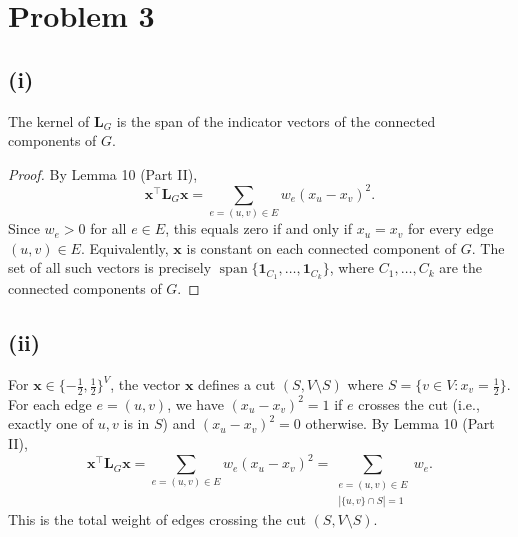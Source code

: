 \section*{Problem 3}

\subsection*{(i)}
The kernel of $\mathbf{L}_G$ is the span of the indicator vectors of the connected components of $G$.

\begin{proof}
By Lemma 10 (Part II),
\[
\mathbf{x}^\top \mathbf{L}_G \mathbf{x} = \sum_{e = (u,v) \in E} w_e (x_u - x_v)^2.
\]
Since $w_e > 0$ for all $e \in E$, this equals zero if and only if $x_u = x_v$ for every edge $(u, v) \in E$. Equivalently, $\mathbf{x}$ is constant on each connected component of $G$. The set of all such vectors is precisely $\operatorname{span}\{\mathbf{1}_{C_1}, \ldots, \mathbf{1}_{C_k}\}$, where $C_1, \ldots, C_k$ are the connected components of $G$.
\end{proof}

\subsection*{(ii)}
For $\mathbf{x} \in \{-\tfrac{1}{2}, \tfrac{1}{2}\}^V$, the vector $\mathbf{x}$ defines a cut $(S, V \setminus S)$ where $S = \{v \in V : x_v = \tfrac{1}{2}\}$. For each edge $e = (u,v)$, we have $(x_u - x_v)^2 = 1$ if $e$ crosses the cut (i.e., exactly one of $u, v$ is in $S$) and $(x_u - x_v)^2 = 0$ otherwise. By Lemma 10 (Part II),
\[
\mathbf{x}^\top \mathbf{L}_G \mathbf{x} = \sum_{e = (u,v) \in E} w_e (x_u - x_v)^2 = \sum_{\substack{e = (u,v) \in E \\ |\{u,v\} \cap S| = 1}} w_e.
\]
This is the total weight of edges crossing the cut $(S, V \setminus S)$.


